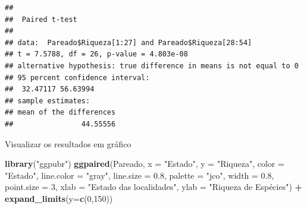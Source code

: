 \documentclass[
]{book}
\newenvironment{Shaded}{\begin{snugshade}}{\end{snugshade}}
\newcommand{\CommentTok}[1]{\textcolor[rgb]{0.56,0.35,0.01}{\textit{#1}}}
\newcommand{\DataTypeTok}[1]{\textcolor[rgb]{0.13,0.29,0.53}{#1}}
\newcommand{\DecValTok}[1]{\textcolor[rgb]{0.00,0.00,0.81}{#1}}
\newcommand{\FloatTok}[1]{\textcolor[rgb]{0.00,0.00,0.81}{#1}}
\newcommand{\KeywordTok}[1]{\textcolor[rgb]{0.13,0.29,0.53}{\textbf{#1}}}
\newcommand{\NormalTok}[1]{#1}
\newcommand{\OperatorTok}[1]{\textcolor[rgb]{0.81,0.36,0.00}{\textbf{#1}}}
\newcommand{\OtherTok}[1]{\textcolor[rgb]{0.56,0.35,0.01}{#1}}
\newcommand{\StringTok}[1]{\textcolor[rgb]{0.31,0.60,0.02}{#1}}
\begin{document}
\begin{Shaded}
\end{Shaded}

\begin{verbatim}
## 
## 	Paired t-test
## 
## data:  Pareado$Riqueza[1:27] and Pareado$Riqueza[28:54]
## t = 7.5788, df = 26, p-value = 4.803e-08
## alternative hypothesis: true difference in means is not equal to 0
## 95 percent confidence interval:
##  32.47117 56.63994
## sample estimates:
## mean of the differences 
##                44.55556
\end{verbatim}

Visualizar os resultados em gráfico

\begin{Shaded}
\begin{Highlighting}[]
\KeywordTok{library}\NormalTok{(}\StringTok{"ggpubr"}\NormalTok{)}
\KeywordTok{ggpaired}\NormalTok{(Pareado, }\DataTypeTok{x =} \StringTok{"Estado"}\NormalTok{, }\DataTypeTok{y =} \StringTok{"Riqueza"}\NormalTok{,}
         \DataTypeTok{color =} \StringTok{"Estado"}\NormalTok{, }\DataTypeTok{line.color =} \StringTok{"gray"}\NormalTok{, }\DataTypeTok{line.size =} \FloatTok{0.8}\NormalTok{, }\DataTypeTok{palette =} \StringTok{"jco"}\NormalTok{, }\DataTypeTok{width =} \FloatTok{0.8}\NormalTok{,}
         \DataTypeTok{point.size =} \DecValTok{3}\NormalTok{, }\DataTypeTok{xlab =} \StringTok{"Estado das localidades"}\NormalTok{, }\DataTypeTok{ylab =} \StringTok{"Riqueza de Espécies"}\NormalTok{) }\OperatorTok{+}
\StringTok{  }\KeywordTok{expand_limits}\NormalTok{(}\DataTypeTok{y=}\KeywordTok{c}\NormalTok{(}\DecValTok{0}\NormalTok{,}\DecValTok{150}\NormalTok{)) }
\end{Highlighting}
\end{Shaded}
\end{document}
